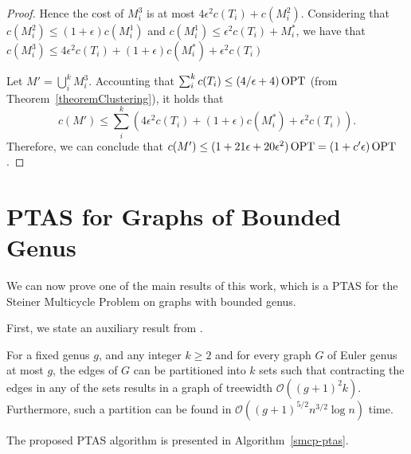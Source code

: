 \begin{proof}
    Hence the cost of \(M_i^3\) is at most \(4 \epsilon^2 c(T_i) + c(M_i^2)\). Considering that \(c(M_i^2) \leq (1 + \epsilon) c(M_i^1)\) and \(c(M_i^1) \leq \epsilon^2 c(T_i) + M^\ast_i\), we have that \(c(M_i^3) \leq 4 \epsilon^2 c(T_i) + (1 + \epsilon) c(M^\ast_i)  + \epsilon^2 c(T_i)\)

    Let \(M' = \bigcup_i^k M_i^3\). Accounting that \(\sum_i^k c(T_i) \leq (4/\epsilon + 4) \operatorname{\textrm{OPT}}\) (from Theorem~\ref{theoremClustering}), it holds that \[c(M') \leq \sum_i^k \left ( 4 \epsilon^2 c(T_i) + (1 + \epsilon) c(M^\ast_i)  + \epsilon^2 c(T_i) \right).\] 
    Therefore, we can conclude that  \(c(M') \leq (1 + 21 \epsilon + 20 \epsilon^2) \operatorname{\textrm{OPT}} = (1 + c'\epsilon) \operatorname{\textrm{OPT}}\).
\end{proof}


\section{PTAS for Graphs of Bounded Genus}
\label{section:ptas_bounded_genus}

We can now prove one of the main results of this work, which is a PTAS for the Steiner Multicycle Problem on graphs with bounded genus.

First, we state an auxiliary result from \cite{Demaine2010}.

\begin{ftheo} \label{demaineResult}
    For a fixed genus \(g\), and any integer \(k \geq 2\) and for every graph \(G\) of Euler genus at most \(g\), the edges of \(G\) can be partitioned into \(k\) sets such that contracting the edges in any of the sets results in a graph of treewidth \(\mathcal{O}((g + 1)^2k)\). Furthermore, such a partition can be found in \(\mathcal{O}((g+ 1)^{5/2} n^{3/2} \log{n})\) time.
\end{ftheo}

The proposed PTAS algorithm is presented in Algorithm~\ref{smcp-ptas}.


